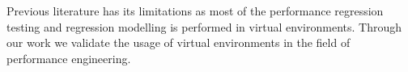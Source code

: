 %

Previous literature has its limitations as most of the performance regression testing and regression modelling  is performed in virtual environments. Through our work we validate the usage of virtual environments in the field of performance engineering. 



